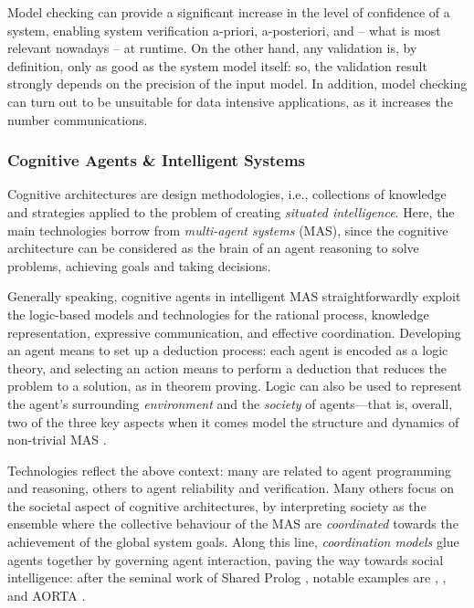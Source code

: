\documentclass[12pt,a4paper,openright,twoside]{book}
\begin{document}

Model checking can provide a significant increase in the level of confidence of a system, enabling system verification a-priori, a-posteriori, and -- what is most relevant nowadays -- at runtime.
%
On the other hand, any validation is, by definition, only as good as the system model itself: so, the validation result strongly depends on the precision of the input model.
%
In addition, model checking can turn out to be unsuitable for data intensive applications, as it increases the number communications.

\subsubsection{Cognitive Agents \& Intelligent Systems}\label{ssec:cognitive-arch}

Cognitive architectures are design methodologies, i.e., collections of knowledge and strategies applied to the problem of creating \emph{situated intelligence}.
%
Here, the main technologies borrow from \emph{multi-agent systems} (MAS), since the cognitive architecture can be considered as the brain of an agent reasoning to solve problems, achieving goals and taking decisions.

Generally speaking, cognitive agents in intelligent MAS straightforwardly exploit the logic-based models and technologies for the rational process, knowledge representation, expressive communication, and effective coordination.
%
Developing an agent means to set up a deduction process: each agent is encoded as a logic theory, and selecting an action means to perform a deduction that reduces the problem to a solution, as in theorem proving.
%
Logic can also be used to represent the agent's surrounding \emph{environment} and the \emph{society} of agents---that is, overall, two of the three key aspects when it comes model the structure and dynamics of non-trivial MAS \cite{soda-aoseI}.

Technologies reflect the above context: many are related to agent programming and reasoning, others to agent reliability and verification.
%
Many others focus on the societal aspect of cognitive architectures, by interpreting society as the ensemble where the collective behaviour of the MAS are \emph{coordinated} towards the achievement of the global system goals.
%
Along this line, \emph{coordination models} glue agents together by governing agent interaction, paving the way towards social intelligence: after the seminal work of Shared Prolog \cite{logictuplespaces-ngc12}, notable examples are \tucson{} \cite{tucson-jaamas2}, \respect{} \cite{respect-scp41}, and AORTA \cite{jensen2014-aorta-emas}.
\end{document}
